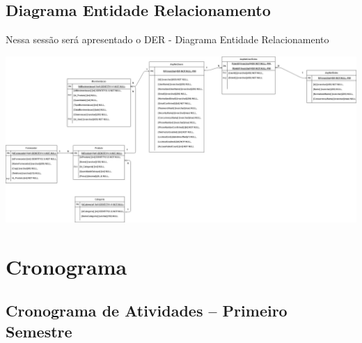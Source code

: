 \documentclass[
	12pt,				%
	openany,			%
	twoside,			%
	a4paper,			%
	english,			%
	brazil				%
	]{abntex2}
\begin{document}
\subsection{Diagrama Entidade Relacionamento}
Nessa sessão será apresentado o DER - Diagrama Entidade Relacionamento

\includegraphics[width=1.0\textwidth]{Figuras/DERestoque.png}



\section{Cronograma}

\subsection{Cronograma de Atividades – Primeiro Semestre}
\end{document}
